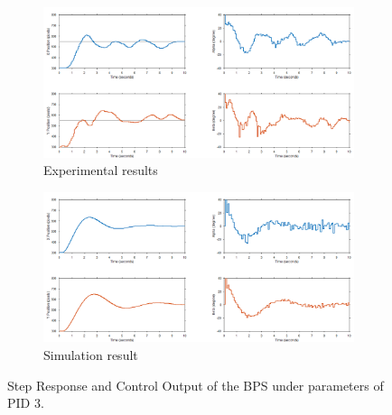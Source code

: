 \begin{figure}[h]
     \centering
     \begin{subfigure}[b]{1\textwidth}
         \centering
         \includegraphics[width=\textwidth]{Figures/chapter05/Step_response_PID3_Expiremental.png}
         \caption{Experimental results}
         \label{fig:y equals x}
     \end{subfigure}
     \hfill
     \begin{subfigure}[b]{1\textwidth}
         \centering
         \includegraphics[width=\textwidth]{Figures/chapter05/Step_response_PID3_Simulation.png}
         \caption{Simulation result}
         \label{fig:three sin x}
     \end{subfigure}
        \caption{Step Response and Control Output of the  BPS under parameters of PID 3.}
        \label{fig:three graphs}
\end{figure}

